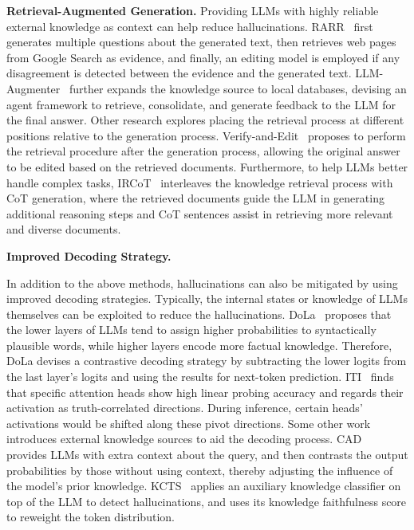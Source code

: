 \textbf{Retrieval-Augmented Generation.} Providing LLMs with highly reliable external knowledge as context can help reduce hallucinations. RARR~\cite{Gao-2023-ACL-RARR} first generates multiple questions about the generated text,  then retrieves web pages from Google Search as evidence, and finally, an editing model is employed if any disagreement is detected between the evidence and the generated text. LLM-Augmenter~\cite{Peng-arxiv-2023-Check} further expands the knowledge source to local databases, devising an agent framework to retrieve, consolidate, and generate feedback to the LLM for the final answer. Other research explores placing the retrieval process at different positions relative to the generation process. Verify-and-Edit~\cite{Zhao-acl-2023-VE} proposes to perform the retrieval procedure after the generation process, allowing the original answer to be edited based on the retrieved documents. Furthermore, to help LLMs better handle complex tasks, IRCoT~\cite{Trivedi-arxiv-2022-Interleaving} interleaves the knowledge retrieval process with CoT generation, where the retrieved documents guide the LLM in generating additional reasoning steps and CoT sentences assist in retrieving more relevant and diverse documents.

\textbf{Improved Decoding Strategy.}

In addition to the above methods, hallucinations can also be mitigated by using improved decoding strategies. Typically, the internal states or knowledge of LLMs themselves can be exploited to reduce the hallucinations. DoLa~\cite{Chuang-arxiv-2023-DoLa} proposes that the lower layers of LLMs tend to assign higher probabilities to syntactically plausible words, while higher layers encode more factual knowledge. Therefore, DoLa devises a contrastive decoding strategy by subtracting the lower logits from the last layer's logits and using the results for next-token prediction. ITI~\cite{Li-2023-nips-ITI} finds that specific attention heads show high linear probing accuracy and regards their activation as truth-correlated directions. During inference, certain heads' activations would be shifted along these pivot directions. Some other work introduces external knowledge sources to aid the decoding process. CAD~\cite{Shi-arxiv-2023-Trusting} provides LLMs with extra context about the query, and then contrasts the output probabilities by those without using context, {thereby adjusting the influence of the model's prior knowledge. } KCTS~\cite{Choi-arxiv-23-KCTs} applies an auxiliary knowledge classifier on top of the LLM to detect hallucinations, and uses its knowledge faithfulness score to reweight the token distribution.

